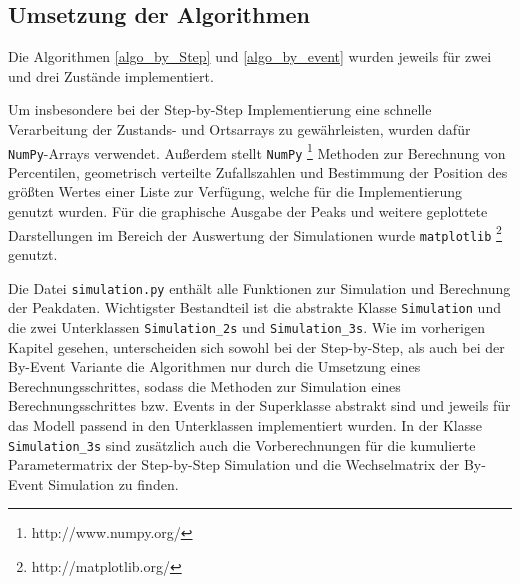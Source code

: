 

\subsection{Umsetzung der Algorithmen}
Die Algorithmen \ref{algo_by_Step} und \ref{algo_by_event} wurden jeweils für zwei und drei Zustände implementiert. 
 
Um insbesondere bei der Step-by-Step Implementierung eine schnelle Verarbeitung der Zustands- und Ortsarrays zu gewährleisten, wurden dafür \texttt{NumPy}-Arrays verwendet. Außerdem stellt \texttt{NumPy} \footnote{http://www.numpy.org/} Methoden zur Berechnung von Percentilen, geometrisch verteilte Zufallszahlen und Bestimmung der Position des größten Wertes einer Liste zur Verfügung, welche für die Implementierung genutzt wurden.
Für die graphische Ausgabe der Peaks und weitere geplottete Darstellungen im Bereich der Auswertung der Simulationen wurde \texttt{matplotlib} \footnote{http://matplotlib.org/} genutzt.


Die Datei \texttt{simulation.py} enthält alle Funktionen zur Simulation und Berechnung der Peakdaten. Wichtigster Bestandteil ist die abstrakte Klasse \texttt{Simulation} und die zwei Unterklassen \texttt{Simulation\_2s} und \texttt{Simulation\_3s}. Wie im vorherigen Kapitel gesehen, unterscheiden sich sowohl bei der Step-by-Step, als auch bei der By-Event Variante die Algorithmen nur durch die Umsetzung eines Berechnungsschrittes, sodass die Methoden zur Simulation eines Berechnungsschrittes bzw. Events in der Superklasse abstrakt sind und jeweils für das Modell passend in den Unterklassen implementiert wurden. In der Klasse \verb!Simulation_3s! sind zusätzlich auch die Vorberechnungen für die kumulierte Parametermatrix der Step-by-Step Simulation und die Wechselmatrix der By-Event Simulation zu finden.

